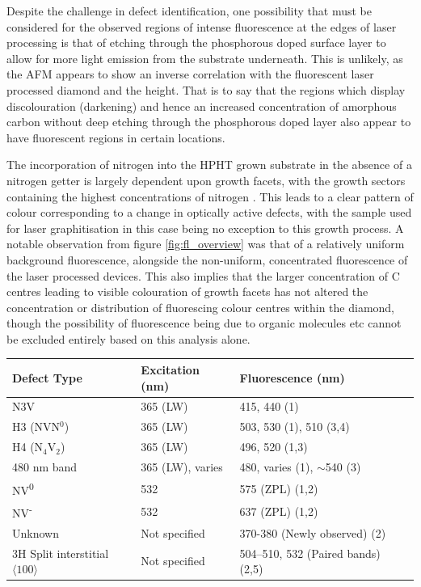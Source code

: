 \begin{refsection}
Despite the challenge in defect identification, one possibility that must be considered for the observed regions of intense fluorescence at the edges of laser processing is that of etching through the phosphorous doped surface layer to allow for more light emission from the substrate underneath. This is unlikely, as the AFM appears to show an inverse correlation with the fluorescent laser processed diamond and the height. That is to say that the regions which display discolouration (darkening) and hence an increased concentration of amorphous carbon without deep etching through the phosphorous doped layer also appear to have fluorescent regions in certain locations.

The incorporation of nitrogen into the HPHT grown substrate in the absence of a nitrogen getter is largely dependent upon growth facets, with the growth sectors  containing the highest concentrations of nitrogen \cite{kanda2000}. This leads to a clear pattern of colour corresponding to a change in optically active defects, with the sample used for laser graphitisation in this case being no exception to this growth process. A notable observation from figure \ref{fig:fl_overview} was that of a relatively uniform background fluorescence, alongside the non-uniform, concentrated fluorescence of the laser processed devices. This also implies that the larger concentration of C centres leading to visible colouration of growth facets has not altered the concentration or distribution of fluorescing colour centres within the diamond, though the possibility of fluorescence being due to organic molecules etc cannot be excluded entirely based on this analysis alone. 

\begin{table}[h]
\centering
\begin{tabular}{|l|l|l|l|}
\hline
\textbf{Defect Type} & \textbf{Excitation (nm)} & \textbf{Fluorescence (nm)} \\
\hline
N3V & 365 (LW) & 415,  440 (1) \\
H3 (NVN$^{0}$) & 365 (LW) & 503, 530 (1), 510 (3,4) \\
H4 (N$_{4}$V$_{2}$) & 365 (LW) & 496, 520 (1,3) \\
480 nm band & 365 (LW), varies & 480, varies (1), $\sim$540 (3) \\
NV\textsuperscript{0} & 532 & 575 (ZPL) (1,2) \\
NV\textsuperscript{-} & 532 & 637 (ZPL) (1,2) \\
Unknown & Not specified & 370-380 (Newly observed) (2) \\
3H Split interstitial $\langle100\rangle$ & Not specified & 504--510, 532 (Paired bands) (2,5) \\
\hline
\end{tabular}


\end{table}
\end{refsection}

